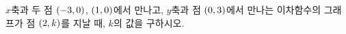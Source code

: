 $x$축과 두 점 $(-3{,}\mkern3mu\mathopen{}0)$, $(1{,}\mkern3mu\mathopen{}0)$에서 만나고, $y$축과 점 $(0{,}\mkern3mu\mathopen{}3)$에서 만나는 이차함수의 그래프가 점 $(2{,}\mkern3mu\mathopen{}k)$를 지날 때, $k$의 값을 구하시오.
